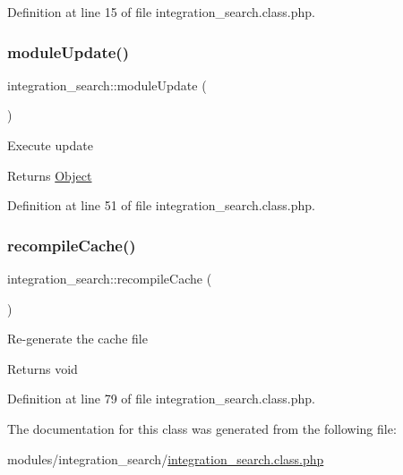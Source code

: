 Definition at line 15 of file integration\+\_\+search.\+class.\+php.

\mbox{\label{classintegration__search_a4a0b59c788e9240fada3131b35ef273c}} 
\subsubsection{\texorpdfstring{module\+Update()}{moduleUpdate()}}
{\footnotesize\ttfamily integration\+\_\+search\+::module\+Update (\begin{DoxyParamCaption}{ }\end{DoxyParamCaption})}

Execute update

\begin{DoxyReturn}{Returns}
\hyperlink{classObject}{Object} 
\end{DoxyReturn}


Definition at line 51 of file integration\+\_\+search.\+class.\+php.

\mbox{\label{classintegration__search_aaa47663580bb0ec22cf7b419ad47f2af}} 
\subsubsection{\texorpdfstring{recompile\+Cache()}{recompileCache()}}
{\footnotesize\ttfamily integration\+\_\+search\+::recompile\+Cache (\begin{DoxyParamCaption}{ }\end{DoxyParamCaption})}

Re-\/generate the cache file

\begin{DoxyReturn}{Returns}
void 
\end{DoxyReturn}


Definition at line 79 of file integration\+\_\+search.\+class.\+php.



The documentation for this class was generated from the following file\+:\begin{DoxyCompactItemize}
\item 
modules/integration\+\_\+search/\hyperlink{integration__search_8class_8php}{integration\+\_\+search.\+class.\+php}\end{DoxyCompactItemize}
